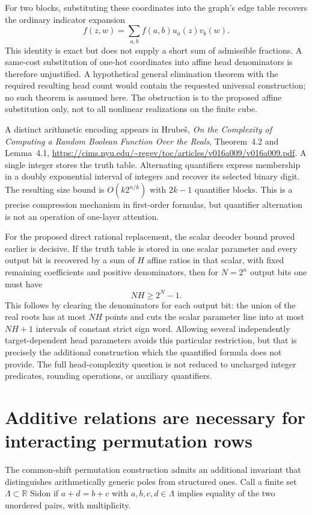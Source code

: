 \documentclass[11pt]{article}
\begin{document}
For two blocks, substituting these coordinates into the graph's edge table
recovers the ordinary indicator expansion
\[
 f(z,w)=\sum_{a,b}f(a,b)u_a(z)v_b(w).
\]
This identity is exact but does not supply a short sum of admissible
fractions. A same-cost substitution of one-hot coordinates into affine
head denominators is therefore unjustified. A hypothetical general
elimination theorem with the required resulting head count would contain
the requested universal construction; no such theorem is assumed here.
The obstruction is to the proposed affine substitution only, not to
all nonlinear realizations on the finite cube.

A distinct arithmetic encoding appears in Hrube\v{s},
\emph{On the Complexity of Computing a Random Boolean Function Over the
Reals}, Theorem~4.2 and Lemma~4.1,
\url{https://cims.nyu.edu/~regev/toc/articles/v016a009/v016a009.pdf}.
A single integer stores the truth table. Alternating quantifiers express
membership in a doubly exponential interval of integers and recover its
selected binary digit. The resulting size bound is
$O(k2^{n/k})$ with $2k-1$ quantifier blocks. This is a precise compression
mechanism in first-order formulas, but quantifier alternation is not an
operation of one-layer attention.

For the proposed direct rational replacement, the scalar decoder bound
proved earlier is decisive. If the truth table is stored in one scalar
parameter and every output bit is recovered by a sum of $H$ affine ratios
in that scalar, with fixed remaining coefficients and positive denominators,
then for $N=2^n$ output bits one must have
\[
 NH\ge2^N-1.
\]
This follows by clearing the denominators for each output bit: the union
of the real roots has at most $NH$ points and cuts the scalar parameter
line into at most $NH+1$ intervals of constant strict sign word.
Allowing several independently target-dependent head parameters avoids
this particular restriction, but that is precisely the additional
construction which the quantified formula does not provide. The full
head-complexity question is not reduced to uncharged integer predicates,
rounding operations, or auxiliary quantifiers.

\section{Additive relations are necessary for interacting permutation rows}

The common-shift permutation construction admits an additional invariant
that distinguishes arithmetically generic poles from structured ones.
Call a finite set $\Lambda\subset\mathbb R$ Sidon if
$a+d=b+c$ with $a,b,c,d\in\Lambda$ implies equality of the two
unordered pairs, with multiplicity.
\end{document}
